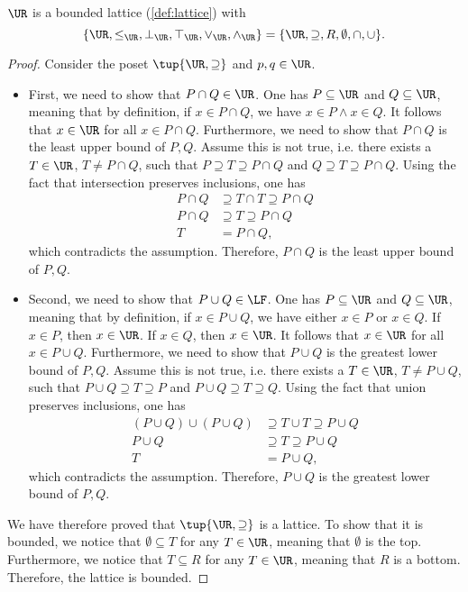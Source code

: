 \begin{lemma}
$\UR$ is a bounded lattice (\cref{def:lattice}) with
\begin{equation}
    \{\UR,\leq_{\UR},\bot_{\UR},\top_{\UR},\vee_{\UR},\wedge_{\UR}\}=\{\UR,\supseteq,R,\emptyset,\cap,\cup\}.
\end{equation}
\begin{proof}
Consider the poset $\tup{\UR,\supseteq}$ and $p,q\in \UR$. 
\begin{itemize}
    \item First, we need to show that $P\cap Q\in \UR$. One has $P \subseteq \UR$ and $Q\subseteq \UR$, meaning that by definition, if $x\in P\cap Q$, we have $x\in P \wedge x\in Q$. It follows that $x\in \UR$ for all $x\in P\cap Q$. Furthermore, we need to show that $P\cap Q$ is the least upper bound of $P,Q$. Assume this is not true, i.e. there exists a $T\in \UR$, $T\neq P\cap Q$, such that $P\supseteq T\supseteq P\cap Q$ and $Q\supseteq T\supseteq P\cap Q$. Using the fact that intersection preserves inclusions, one has
\begin{equation}
\begin{aligned}
    P\cap Q &\supseteq T\cap T \supseteq P\cap Q\\
    P\cap Q &\supseteq T \supseteq P\cap Q\\
    T&= P\cap Q,
\end{aligned}
\end{equation}
which contradicts the assumption. Therefore, $P\cap Q$ is the least upper bound of $P,Q$.
\item Second, we need to show that $P\cup Q\in \LF$. One has $P\subseteq \UR$ and $Q\subseteq \UR$, meaning that by definition, if $x\in P\cup Q$, we have either $x\in P$ or $x\in Q$. If $x\in P$, then $x\in \UR$. If $x\in Q$, then $x\in \UR$. It follows that $x\in \UR$ for all $x\in P\cup Q$.  Furthermore, we need to show that $P\cup Q$ is the greatest lower bound of $P,Q$. Assume this is not true, i.e. there exists a $T\in \UR$, $T\neq P\cup Q$, such that $P\cup Q\supseteq T\supseteq P$ and $P\cup Q\supseteq T\supseteq Q$. Using the fact that union preserves inclusions, one has
\begin{equation}
    \begin{aligned}
    (P\cup Q)\cup (P\cup Q) &\supseteq T \cup T \supseteq P\cup Q\\
    P\cup Q &\supseteq T\supseteq P\cup Q\\
    T&=P\cup Q,
    \end{aligned}
\end{equation}
which contradicts the assumption.  Therefore, $P\cup Q$ is the greatest lower bound of $P,Q$.
\end{itemize}
We have therefore proved that $\tup{\UR,\supseteq}$ is a lattice. To show that it is bounded, we notice that $\emptyset \subseteq T$ for any $T\in \UR$, meaning that $\emptyset$ is the top. Furthermore, we notice that $T\subseteq R$ for any $T\in \UR$, meaning that $R$ is a bottom. Therefore, the lattice is bounded.
\end{proof}
\end{lemma}

